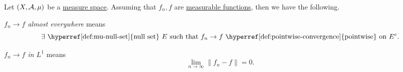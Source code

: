 \begin{definition*}
	Let \((X, \mathcal{\MakeUppercase{a}} , \mu )\) be a \hyperref[def:measure-space]{measure space}. Assuming that \(f_{n}, f\) are \hyperref[def:measurable-function]{measurable functions},
	then we have the following.
	\begin{definition}\label{def:converge-almost-everywhere}
		\emph{\(f_{n}\to f\) almost everywhere} means
		\[
			\exists \text{ \hyperref[def:mu-null-set]{null set} } E\text{ such that } f_{n}\to f \text{ \hyperref[def:pointwise-convergence]{pointwise} on } E^{c}.
		\]
	\end{definition}
	\begin{definition}[Converge in \(L^1\)]\label{def:converge-in-L-1}
		\emph{\(f_{n}\to f\) in \(L^1\)} means
		\[
			\lim\limits_{n \to \infty} \left\lVert f_{n} - f\right\rVert = 0.
		\]
	\end{definition}
\end{definition*}
